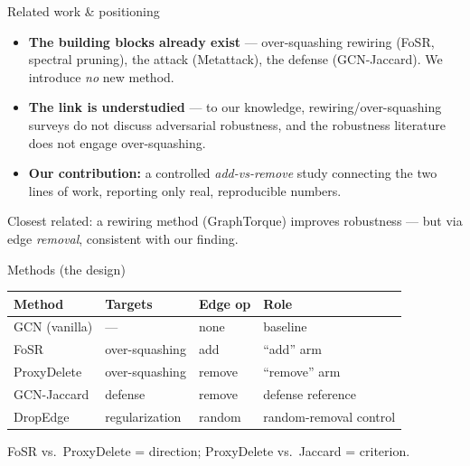 \documentclass[aspectratio=169]{beamer}
\begin{document}
\begin{frame}{Related work \& positioning}
  \begin{itemize}
    \item \textbf{The building blocks already exist} --- over-squashing rewiring (FoSR, spectral pruning),
      the attack (Metattack), the defense (GCN-Jaccard). We introduce \emph{no} new method.
    \item \textbf{The link is understudied} --- to our knowledge, rewiring/over-squashing surveys do not
      discuss adversarial robustness, and the robustness literature does not engage over-squashing.
    \item[$\Rightarrow$] \textbf{Our contribution:} a controlled \emph{add-vs-remove} study connecting the
      two lines of work, reporting only real, reproducible numbers.
  \end{itemize}
  \vfill
  {\footnotesize Closest related: a rewiring method (GraphTorque) improves robustness --- but via edge
  \emph{removal}, consistent with our finding.}
\end{frame}

\begin{frame}{Methods (the design)}
  \centering
  \begin{tabular}{@{}llll@{}}
    \toprule
    Method & Targets & Edge op & Role \\
    \midrule
    GCN (vanilla)        & ---            & none   & baseline \\
    FoSR                 & over-squashing & add    & ``add'' arm \\
    ProxyDelete          & over-squashing & remove & ``remove'' arm \\
    GCN-Jaccard          & defense        & remove & defense reference \\
    DropEdge             & regularization & random & random-removal control \\
    \bottomrule
  \end{tabular}
  \vfill
  \footnotesize FoSR vs.\ ProxyDelete = direction; ProxyDelete vs.\ Jaccard = criterion.
\end{frame}
\end{document}
